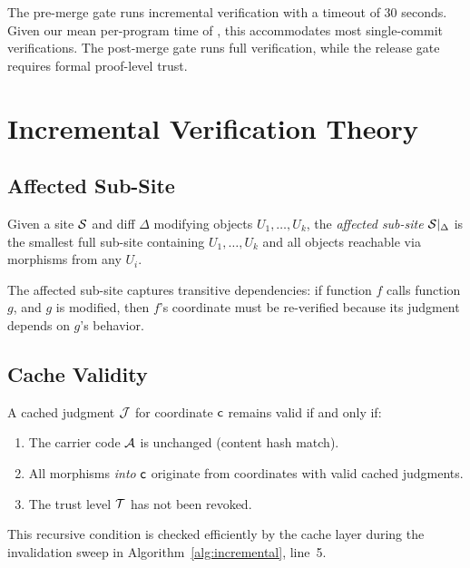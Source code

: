 \documentclass[11pt]{article}
\begin{document}
The pre-merge gate runs incremental verification with a timeout of 30 seconds.
Given our mean per-program time of \expTimeMean{}, this accommodates most
single-commit verifications. The post-merge gate runs full verification,
while the release gate requires formal proof-level trust.

\section{Incremental Verification Theory}\label{sec:incremental}

\subsection{Affected Sub-Site}

\begin{definition}
Given a site $\mathcal{S}$ and diff $\Delta$ modifying objects $U_1, \ldots, U_k$,
the \emph{affected sub-site} $\mathcal{S}|_\Delta$ is the smallest full sub-site
containing $U_1, \ldots, U_k$ and all objects reachable via morphisms from
any $U_i$.
\end{definition}

The affected sub-site captures transitive dependencies: if function $f$ calls
function $g$, and $g$ is modified, then $f$'s coordinate must be re-verified
because its judgment depends on $g$'s behavior.

\subsection{Cache Validity}

\begin{proposition}
A cached judgment $\mathcal{J}$ for coordinate $\mathsf{c}$ remains valid if and only if:
\begin{enumerate}
  \item The carrier code $\mathcal{A}$ is unchanged (content hash match).
  \item All morphisms \emph{into} $\mathsf{c}$ originate from coordinates with
        valid cached judgments.
  \item The trust level $\mathcal{T}$ has not been revoked.
\end{enumerate}
\end{proposition}

This recursive condition is checked efficiently by the cache layer during the
invalidation sweep in Algorithm~\ref{alg:incremental}, line~5.
\end{document}
